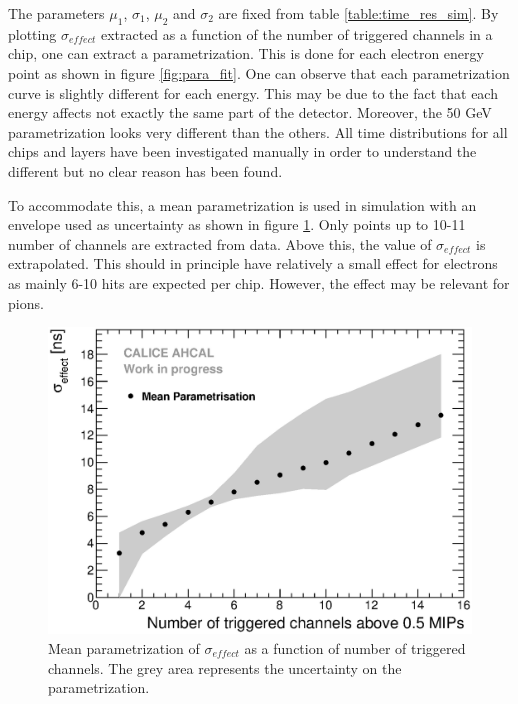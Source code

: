 The parameters $\mu_1$, $\sigma_1$, $\mu_2$ and $\sigma_2$ are fixed from table \ref{table:time_res_sim}. By plotting $\sigma_{effect}$ extracted as a function of the number of triggered channels in a chip, one can extract a parametrization. This is done for each electron energy point as shown in figure \ref{fig:para_fit}. One can observe that each parametrization curve is slightly different for each energy. This may be due to the fact that each energy affects not exactly the same part of the detector. Moreover, the 50 GeV parametrization looks very different than the others. All time distributions for all chips and layers have been investigated manually in order to understand the different but no clear reason has been found.

To accommodate this, a mean parametrization is used in simulation with an envelope used as uncertainty as shown in figure \ref{fig:mean_para}. Only points up to 10-11 number of channels are extracted from data. Above this, the value of $\sigma_{effect}$ is extrapolated. This should in principle have relatively a small effect for electrons as mainly 6-10 hits are expected per chip. However, the effect may be relevant for pions.

\begin{figure}[htbp!]
	\centering
	\includegraphics[width=0.7\linewidth]{../Thesis_Plots/Timing/Electrons/Plots/MeanParametrisationWithSystErrors.eps}
	\caption{Mean parametrization of $\sigma_{effect}$ as a function of number of triggered channels. The grey area represents the uncertainty on the parametrization.}
	\label{fig:mean_para}
\end{figure}
